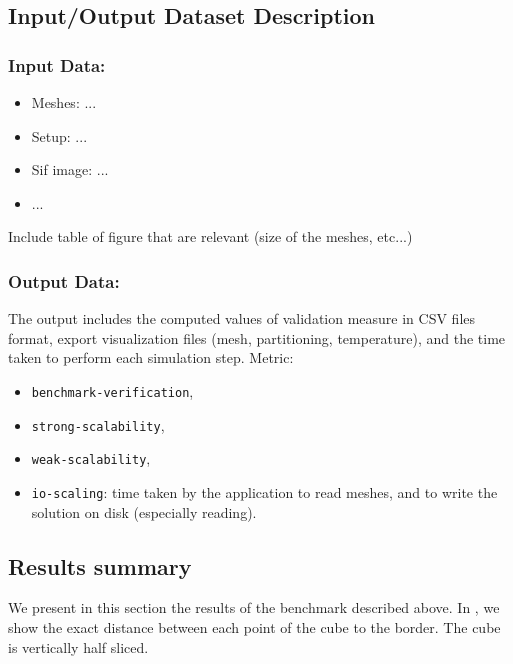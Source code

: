\subsection{Input/Output Dataset Description}


\subsubsection{Input Data:}
  \begin{itemize}
  \item Meshes: ...
  \item Setup: ...
  \item Sif image: ...
  \item ...
  \end{itemize}

Include table of figure that are relevant (size of the meshes, etc...)

\subsubsection{Output Data:}

The output includes the computed values of validation measure in CSV files format, export visualization files (mesh, partitioning, temperature), and the time taken to perform each simulation step.
Metric:
\begin{itemize}
    \item \texttt{benchmark-verification},
    \item \texttt{strong-scalability},
    \item \texttt{weak-scalability},
    \item \texttt{io-scaling}: time taken by the application to read meshes, and to write the solution on disk (especially reading).
\end{itemize}





\subsection{Results summary}

We present in this section the results of the benchmark described above.
In , we show the exact distance between each point of the cube to the border.
The cube is vertically half sliced.

